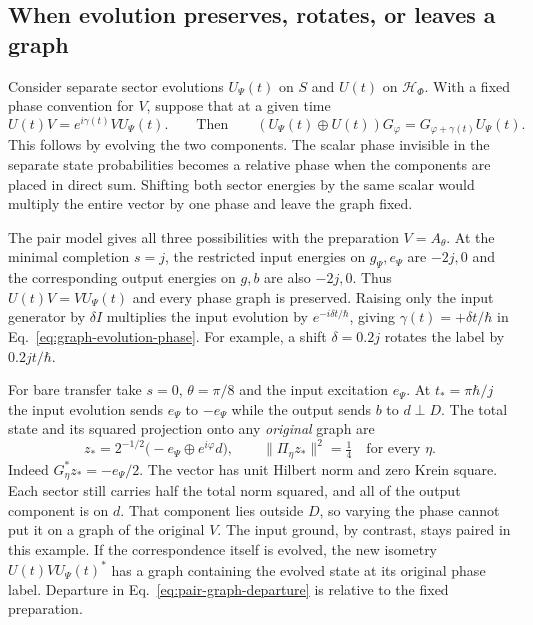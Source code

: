 \documentclass[11pt]{article}
\theoremstyle{definition}
\begin{document}
\subsection{When evolution preserves, rotates, or leaves a graph}

Consider separate sector evolutions $U_\Psi(t)$ on $S$ and $U(t)$ on $\mathcal H_\Phi$. With a fixed phase convention for $V$, suppose that at a given time
\begin{equation}
 U(t)V=e^{i\gamma(t)}VU_\Psi(t).
 \qquad\text{Then}\qquad
 (U_\Psi(t)\oplus U(t))G_\varphi=G_{\varphi+\gamma(t)}U_\Psi(t).
 \label{eq:graph-evolution-phase}
\end{equation}
This follows by evolving the two components. The scalar phase invisible in the separate state probabilities becomes a relative phase when the components are placed in direct sum. Shifting both sector energies by the same scalar would multiply the entire vector by one phase and leave the graph fixed.

The pair model gives all three possibilities with the preparation $V=A_\theta$. At the minimal completion $s=j$, the restricted input energies on $g_\Psi,e_\Psi$ are $-2j,0$ and the corresponding output energies on $g,b$ are also $-2j,0$. Thus $U(t)V=VU_\Psi(t)$ and every phase graph is preserved. Raising only the input generator by $\delta I$ multiplies the input evolution by $e^{-i\delta t/\hbar}$, giving $\gamma(t)=+\delta t/\hbar$ in Eq.~\eqref{eq:graph-evolution-phase}. For example, a shift $\delta=0.2j$ rotates the label by $0.2jt/\hbar$.

For bare transfer take $s=0$, $\theta=\pi/8$ and the input excitation $e_\Psi$. At $t_*=\pi\hbar/j$ the input evolution sends $e_\Psi$ to $-e_\Psi$ while the output sends $b$ to $d\perp D$. The total state and its squared projection onto any \emph{original} graph are
\begin{equation}
 z_* = 2^{-1/2}\bigl(-e_\Psi\oplus e^{i\varphi}d\bigr),\qquad
 \|\Pi_\eta z_*\|^2=\tfrac14\quad\text{for every }\eta .
 \label{eq:pair-graph-departure}
\end{equation}
Indeed $G_\eta^*z_*=-e_\Psi/2$. The vector has unit Hilbert norm and zero Krein square. Each sector still carries half the total norm squared, and all of the output component is on $d$. That component lies outside $D$, so varying the phase cannot put it on a graph of the original $V$. The input ground, by contrast, stays paired in this example. If the correspondence itself is evolved, the new isometry $U(t)VU_\Psi(t)^*$ has a graph containing the evolved state at its original phase label. Departure in Eq.~\eqref{eq:pair-graph-departure} is relative to the fixed preparation.
\end{document}

